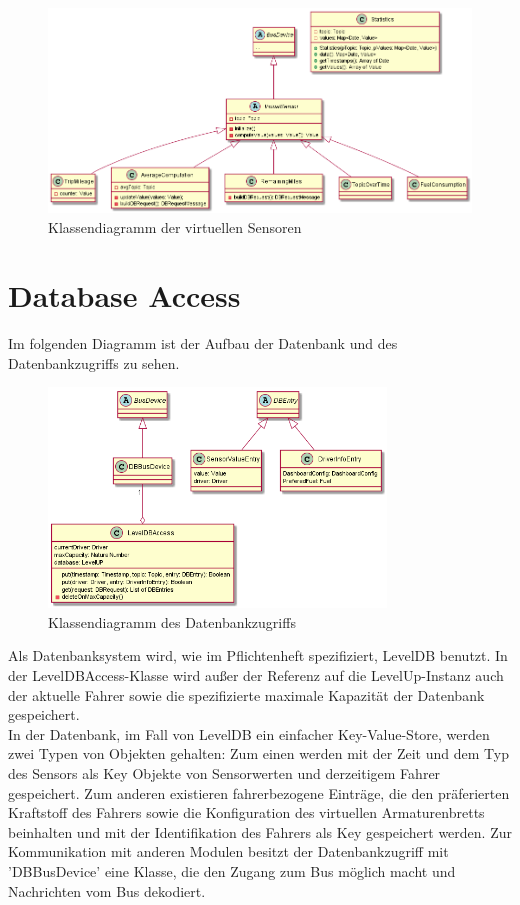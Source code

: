 \documentclass[entwurf.tex]{subfiles}
\begin{document}
		\begin{figure}[H]
  			\begin{center}
 				\includegraphics[width=0.8\textheight,angle=90]{diagrams/VirtualSensors.png}
  				\caption{Klassendiagramm der virtuellen Sensoren}
  			\end{center}
  		\end{figure}
  	\newpage
  	\section{Database Access}
  		Im folgenden Diagramm ist der Aufbau der Datenbank und des Datenbankzugriffs zu sehen.
  		\begin{figure}[H]
  			\begin{center}
 				\includegraphics[width=0.8\textwidth]{diagrams/DBAccess.png}
  				\caption{Klassendiagramm des Datenbankzugriffs}
  			\end{center}
  		\end{figure}
  	Als Datenbanksystem wird, wie im Pflichtenheft spezifiziert, LevelDB benutzt. In der LevelDBAccess-Klasse wird außer der Referenz auf die LevelUp-Instanz auch der aktuelle Fahrer sowie die spezifizierte maximale Kapazität der Datenbank gespeichert. \\ In der Datenbank, im Fall von LevelDB ein einfacher Key-Value-Store, werden zwei Typen von Objekten gehalten: Zum einen werden mit der Zeit und dem Typ des Sensors als Key Objekte von Sensorwerten und derzeitigem Fahrer gespeichert. Zum anderen existieren fahrerbezogene Einträge, die den präferierten Kraftstoff des Fahrers sowie die Konfiguration des virtuellen Armaturenbretts beinhalten und mit der Identifikation des Fahrers als Key gespeichert werden. Zur Kommunikation mit anderen Modulen besitzt der Datenbankzugriff mit 'DBBusDevice' eine Klasse, die den Zugang zum Bus möglich macht und Nachrichten vom Bus dekodiert. 
  	
\end{document}
